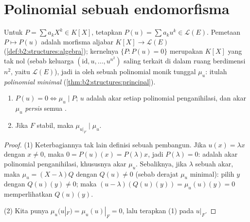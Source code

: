 \section{Polinomial sebuah endomorfisma}

\begin{definition}\label{def:b2:reduction:polyu}
Untuk $P = \sum a_k X^k \in K[X]$, tetapkan $P(u) = \sum a_k u^k \in
\mathcal{L}(E)$. Pemetaan $P \mapsto P(u)$ adalah morfisma aljabar
$K[X] \to \mathcal{L}(E)$ (\cref{def:b2:structures:algebra});
kernelnya $\{P : P(u) = 0\}$ merupakan  $K[X]$ yang tak nol (sebab
keluarga $(\mathrm{id}, u, \dots, u^{n^2})$ saling terkait di dalam ruang
berdimensi $n^2$, yaitu $\mathcal{L}(E)$), jadi ia  oleh sebuah
polinomial monik tunggal $\mu_u$: itulah \emph{polinomial
minimal}
(\cref{thm:b2:structures:principal}).
\end{definition}

\begin{proposition}\label{prop:b2:reduction:minpoly}
\begin{enumerate}
  \item $P(u) = 0 \iff \mu_u \mid P$;  $u$ adalah akar
        setiap polinomial penganihilasi, dan akar $\mu_u$
        \emph{persis} semua .
  \item Jika $F$ stabil, maka $\mu_{u|_F} \mid \mu_u$.
\end{enumerate}
\end{proposition}

\begin{proof}
(1) Keterbagiannya tak lain definisi sebuah pembangun. Jika $u(x) =
\lambda x$ dengan $x \neq 0$, maka $0 = P(u)(x) = P(\lambda)x$, jadi
$P(\lambda) = 0$:  adalah akar polinomial penganihilasi,
khususnya akar $\mu_u$. Sebaliknya, jika $\lambda$ sebuah akar, maka
$\mu_u = (X - \lambda)Q$ dengan $Q(u) \neq 0$ (sebab derajat $\mu_u$
minimal): pilih $y$ dengan $Q(u)(y) \neq 0$; maka $(u - \lambda)(Q(u)(y))
= \mu_u(u)(y) = 0$ memperlihatkan  $Q(u)(y)$.

(2) Kita punya $\mu_u(u|_F) = \mu_u(u)|_F = 0$, lalu terapkan (1) pada $u|_F$.
\end{proof}

